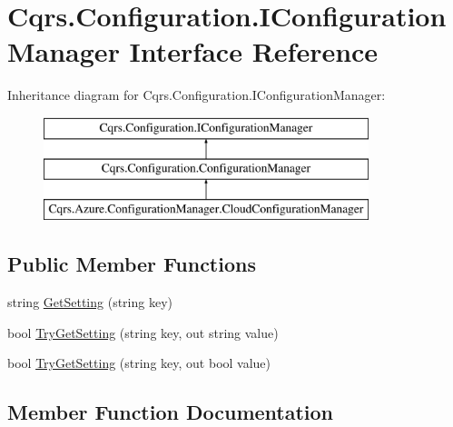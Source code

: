 \hypertarget{interfaceCqrs_1_1Configuration_1_1IConfigurationManager}{}\section{Cqrs.\+Configuration.\+I\+Configuration\+Manager Interface Reference}
\label{interfaceCqrs_1_1Configuration_1_1IConfigurationManager}
Inheritance diagram for Cqrs.\+Configuration.\+I\+Configuration\+Manager\+:\begin{figure}[H]
\begin{center}
\leavevmode
\includegraphics[height=3.000000cm]{interfaceCqrs_1_1Configuration_1_1IConfigurationManager}
\end{center}
\end{figure}
\subsection*{Public Member Functions}
\begin{DoxyCompactItemize}
\item 
string \hyperlink{interfaceCqrs_1_1Configuration_1_1IConfigurationManager_a9f7b7d4d8c26a0589f01c8a7f69901ef_a9f7b7d4d8c26a0589f01c8a7f69901ef}{Get\+Setting} (string key)
\item 
bool \hyperlink{interfaceCqrs_1_1Configuration_1_1IConfigurationManager_ac4478405e3d9e1c97d14953aea4e695b_ac4478405e3d9e1c97d14953aea4e695b}{Try\+Get\+Setting} (string key, out string value)
\item 
bool \hyperlink{interfaceCqrs_1_1Configuration_1_1IConfigurationManager_a8389181330999fcb8e30af4dbb56d35e_a8389181330999fcb8e30af4dbb56d35e}{Try\+Get\+Setting} (string key, out bool value)
\end{DoxyCompactItemize}


\subsection{Member Function Documentation}
\mbox{\label{interfaceCqrs_1_1Configuration_1_1IConfigurationManager_a9f7b7d4d8c26a0589f01c8a7f69901ef_a9f7b7d4d8c26a0589f01c8a7f69901ef}} 
